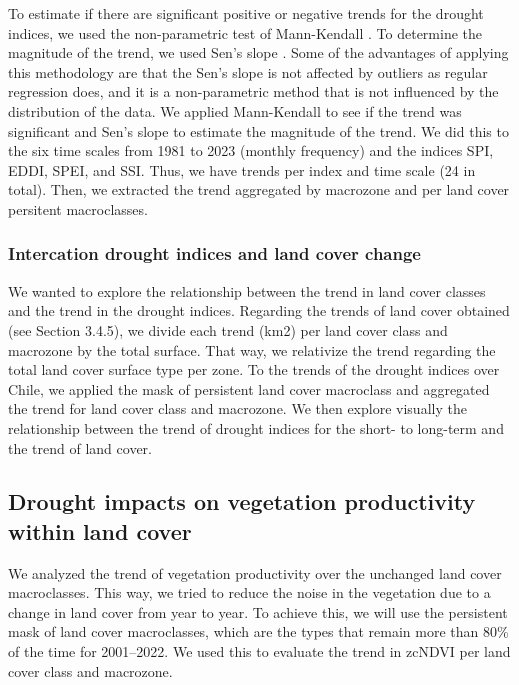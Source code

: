 \documentclass[
  authoryear,
  preprint,
  3p,
  onecolumn]{elsarticle}
\begin{document}
To estimate if there are significant positive or negative trends for the
drought indices, we used the non-parametric test of Mann-Kendall
\citep{Kendall1975}. To determine the magnitude of the trend, we used
Sen's slope \citep{Sen1968}. Some of the advantages of applying this
methodology are that the Sen's slope is not affected by outliers as
regular regression does, and it is a non-parametric method that is not
influenced by the distribution of the data. We applied Mann-Kendall to
see if the trend was significant and Sen's slope to estimate the
magnitude of the trend. We did this to the six time scales from 1981 to
2023 (monthly frequency) and the indices SPI, EDDI, SPEI, and SSI. Thus,
we have trends per index and time scale (24 in total). Then, we
extracted the trend aggregated by macrozone and per land cover persitent
macroclasses.

\hypertarget{intercation-drought-indices-and-land-cover-change}{%
\subsubsection{Intercation drought indices and land cover
change}\label{intercation-drought-indices-and-land-cover-change}}

We wanted to explore the relationship between the trend in land cover
classes and the trend in the drought indices. Regarding the trends of
land cover obtained (see Section 3.4.5), we divide each trend (km2) per
land cover class and macrozone by the total surface. That way, we
relativize the trend regarding the total land cover surface type per
zone. To the trends of the drought indices over Chile, we applied the
mask of persistent land cover macroclass and aggregated the trend for
land cover class and macrozone. We then explore visually the
relationship between the trend of drought indices for the short- to
long-term and the trend of land cover.

\hypertarget{drought-impacts-on-vegetation-productivity-within-land-cover}{%
\subsection{Drought impacts on vegetation productivity within land
cover}\label{drought-impacts-on-vegetation-productivity-within-land-cover}}

We analyzed the trend of vegetation productivity over the unchanged land
cover macroclasses. This way, we tried to reduce the noise in the
vegetation due to a change in land cover from year to year. To achieve
this, we will use the persistent mask of land cover macroclasses, which
are the types that remain more than 80\% of the time for 2001--2022. We
used this to evaluate the trend in zcNDVI per land cover class and
macrozone.
\end{document}
